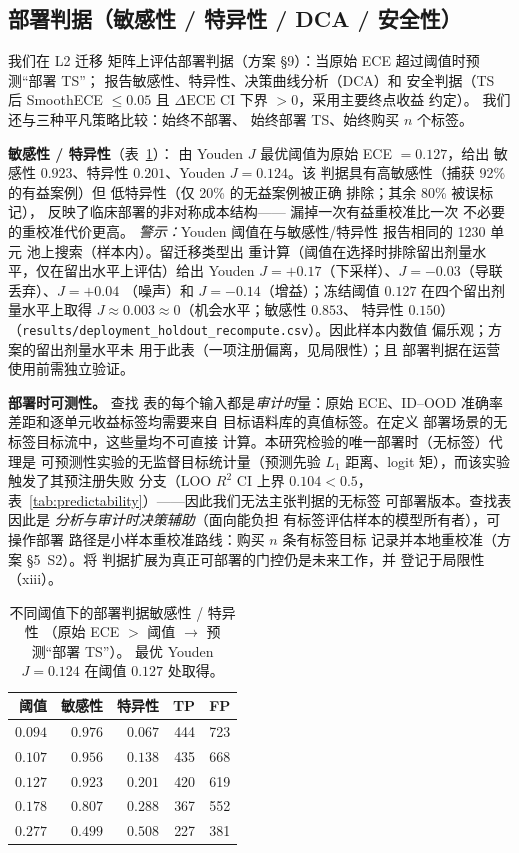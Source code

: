 \subsection{部署判据（敏感性 / 特异性 / DCA / 安全性）}
\label{sec:deployment}
我们在 L2 迁移
矩阵上评估部署判据（方案 \S9）：当原始 ECE 超过阈值时预测``部署 TS''；
报告敏感性、特异性、决策曲线分析（DCA）和
安全判据（TS 后 SmoothECE $\leq 0.05$ 且
$\Delta\text{ECE}$ CI 下界 $>0$，采用主要终点收益
约定）。
我们还与三种平凡策略比较：始终不部署、
始终部署 TS、始终购买 $n$ 个标签。

\textbf{敏感性 / 特异性}（表~\ref{tab:deploy_sens}）：
由 Youden $J$ 最优阈值为原始 ECE $=0.127$，给出
敏感性 $0.923$、特异性 $0.201$、Youden $J=0.124$。该
判据具有高敏感性（捕获 92\% 的有益案例）但
低特异性（仅 20\% 的无益案例被正确
排除；其余 80\% 被误标记），
反映了临床部署的非对称成本结构——
漏掉一次有益重校准比一次
不必要的重校准代价更高。
\emph{警示：}Youden 阈值在与敏感性/特异性
报告相同的 1230 单元
池上搜索（样本内）。留迁移类型出
重计算（阈值在选择时排除留出剂量水平，仅在留出水平上评估）给出
Youden $J=+0.17$（下采样）、$J=-0.03$（导联丢弃）、$J=+0.04$
（噪声）和 $J=-0.14$（增益）；冻结阈值 $0.127$ 在四个留出剂量水平上取得
$J\approx 0.003\approx 0$（机会水平；敏感性 $0.853$、
特异性 $0.150$）（\texttt{results/deployment\_holdout\_recompute.csv}）。因此样本内数值
偏乐观；方案的留出剂量水平未
用于此表（一项注册偏离，见局限性）；且
部署判据在运营使用前需独立验证。

\textbf{部署时可测性。} 查找
表的每个输入都是\emph{审计时}量：原始 ECE、ID--OOD
准确率差距和逐单元收益标签均需要来自
目标语料库的真值标签。在定义
部署场景的无标签目标流中，这些量均不可直接
计算。本研究检验的唯一部署时（无标签）代理是
可预测性实验的无监督目标统计量（预测先验 $L_1$ 距离、logit
矩），而该实验触发了其预注册失败
分支（LOO $R^2$ CI 上界 $0.104 < 0.5$，
表~\ref{tab:predictability}）——因此我们无法主张判据的无标签
可部署版本。查找表因此是
\emph{分析与审计时决策辅助}（面向能负担
有标签评估样本的模型所有者），可操作部署
路径是小样本重校准路线：购买 $n$ 条有标签目标
记录并本地重校准（方案 \S5~S2）。将
判据扩展为真正可部署的门控仍是未来工作，并
登记于局限性（xiii）。

\begin{table}[t]
\centering
\caption{不同阈值下的部署判据敏感性 / 特异性
（原始 ECE $>$ 阈值 $\rightarrow$ 预测``部署 TS''）。
最优 Youden $J=0.124$ 在阈值 $0.127$ 处取得。}
\label{tab:deploy_sens}
\begin{tabular}{rrrrr}
\toprule
阈值 & 敏感性 & 特异性 & TP & FP \\
\midrule
$0.094$ & $0.976$ & $0.067$ & 444 & 723 \\
$0.107$ & $0.956$ & $0.138$ & 435 & 668 \\
$0.127$ & $0.923$ & $0.201$ & 420 & 619 \\
$0.178$ & $0.807$ & $0.288$ & 367 & 552 \\
$0.277$ & $0.499$ & $0.508$ & 227 & 381 \\
\bottomrule
\end{tabular}
\end{table}

